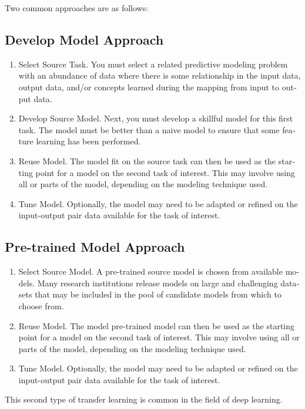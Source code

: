 \documentclass{article}
\begin{document}
\begin{latin}
Two common approaches are as follows:
\subsection{Develop Model Approach}
\begin{enumerate}
    \item Select Source Task. You must select a related predictive modeling problem with an abundance of data where there is some relationship in the input data, output data, and/or concepts learned during the mapping from input to output data.
    \item Develop Source Model. Next, you must develop a skillful model for this first task. The model must be better than a naive model to ensure that some feature learning has been performed.
    \item Reuse Model. The model fit on the source task can then be used as the starting point for a model on the second task of interest. This may involve using all or parts of the model, depending on the modeling technique used.
    \item Tune Model. Optionally, the model may need to be adapted or refined on the input-output pair data available for the task of interest.
\end{enumerate}

\subsection{Pre-trained Model Approach}
\begin{enumerate}

    \item Select Source Model. A pre-trained source model is chosen from available models. Many research institutions release models on large and challenging datasets that may be included in the pool of candidate models from which to choose from.
    \item Reuse Model. The model pre-trained model can then be used as the starting point for a model on the second task of interest. This may involve using all or parts of the model, depending on the modeling technique used.
    \item Tune Model. Optionally, the model may need to be adapted or refined on the input-output pair data available for the task of interest.

\end{enumerate}
This second type of transfer learning is common in the field of deep learning.


\end{latin}
\end{document}
